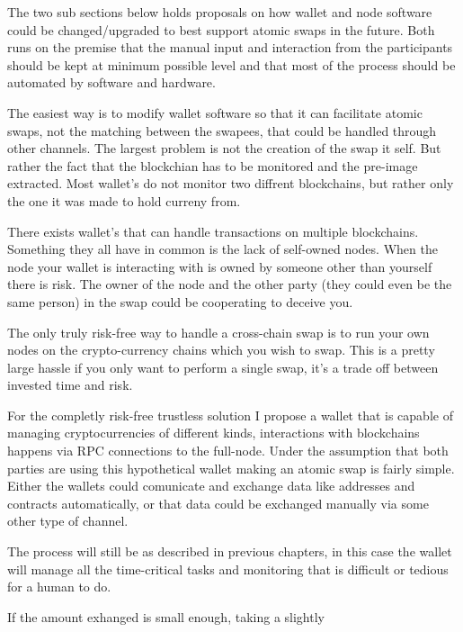 The two sub sections below holds proposals on how wallet and node software could be changed/upgraded to best support atomic swaps in the future. Both runs on the premise that the manual input and interaction from the participants should be kept at minimum possible level and that most of the process should be automated by software and hardware.

The easiest way is to modify wallet software so that it can facilitate atomic swaps, not the matching between the swapees, 
that could be handled through other channels. The largest problem is not the creation of the swap it self. But rather
the fact that the blockchian has to be monitored and the pre-image extracted. Most wallet's do not monitor two diffrent blockchains,
but rather only the one it was made to hold curreny from. 

There exists wallet's that can handle transactions on multiple blockchains. Something they all have in common is the lack of self-owned
nodes. When the node your wallet is interacting with is owned by someone other than yourself there is risk. The owner of the node and
the other party (they could even be the same person) in the swap could be cooperating to deceive you. 

The only truly risk-free way to handle a cross-chain swap is to run your own nodes on the crypto-currency chains which you wish to swap.
This is a pretty large hassle if you only want to perform a single swap, it's a trade off between invested time and risk. 

For the completly risk-free trustless solution I propose a wallet that is capable of managing cryptocurrencies of different kinds, 
interactions with blockchains happens via RPC connections to the full-node. Under the assumption that both parties are using this
hypothetical wallet making an atomic swap is fairly simple. Either the wallets could comunicate and exchange data like addresses 
and contracts automatically, or that data could be exchanged manually via some other type of channel.

The process will still be as described in previous chapters, in this case the wallet will manage all the time-critical tasks and 
monitoring that is difficult or tedious for a human to do.


If the amount exhanged is small enough, taking a slightly 
